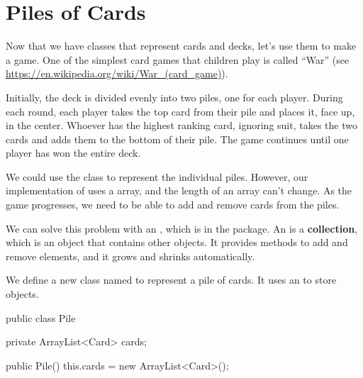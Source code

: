 \section{Piles of Cards}


Now that we have classes that represent cards and decks, let's use them to make a game.
One of the simplest card games that children play is called ``War'' (see \url{https://en.wikipedia.org/wiki/War_(card_game)}).

Initially, the deck is divided evenly into two piles, one for each player.
During each round, each player takes the top card from their pile and places it, face up, in the center.
Whoever has the highest ranking card, ignoring suit, takes the two cards and adds them to the bottom of their pile.
The game continues until one player has won the entire deck.

We could use the  class to represent the individual piles.
However, our implementation of  uses a  array, and the length of an array can't change.
As the game progresses, we need to be able to add and remove cards from the piles.


We can solve this problem with an , which is in the  package.
An  is a {\bf collection}, which is an object that contains other objects.
It provides methods to add and remove elements, and it grows and shrinks automatically.



We define a new class named  to represent a pile of cards.
It uses an  to store  objects.

\begin{code}
public class Pile {
    private ArrayList<Card> cards;

    public Pile() {
        this.cards = new ArrayList<Card>();
    }
}
\end{code}


